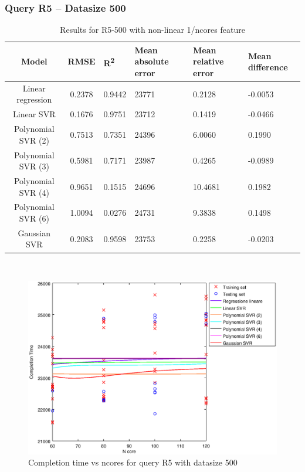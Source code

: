 \documentclass[a4paper,11pt]{article}
\begin{document}
\newpage
\subsubsection{Query R5 -- Datasize 500}
\begin{table}[H]
	\centering
	\begin{adjustbox}{center}
		\begin{tabular}{c | c M{1.2cm} M{2.5cm} M{2.5cm} M{1.8cm}}
			Model & RMSE & R\textsuperscript{2} & Mean absolute error & Mean relative error & Mean difference \tabularnewline
			\hline
			Linear regression & 0.2378 & 0.9442 &  23771 & 0.2128 & -0.0053 \\
			Linear SVR & 0.1676 & 0.9751 &  23712 & 0.1419 & -0.0466 \\
			Polynomial SVR (2) & 0.7513 & 0.7351 &  24396 & 6.0060 & 0.1990 \\
			Polynomial SVR (3) & 0.5981 & 0.7171 &  23987 & 0.4265 & -0.0989 \\
			Polynomial SVR (4) & 0.9651 & 0.1515 &  24696 & 10.4681 & 0.1982 \\
			Polynomial SVR (6) & 1.0094 & 0.0276 &  24731 & 9.3838 & 0.1498 \\
			Gaussian SVR & 0.2083 & 0.9598 &  23753 & 0.2258 & -0.0203 \\
		\end{tabular}
	\end{adjustbox}
	\\
	\caption{Results for R5-500 with non-linear 1/ncores feature}
	\label{table_R5_prediction_all}
\end{table}

\begin {figure}[hbtp]
\centering
\includegraphics[width=\textwidth]{output/R5_500_1_OVER_NCORES/plot_R5_500.eps}
\caption {Completion time vs ncores for query R5 with datasize 500}
\end {figure}
\end{document}
